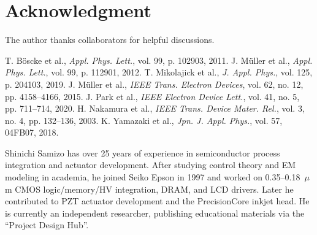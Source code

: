 \documentclass[conference]{IEEEtran}
\begin{document}
\section*{Acknowledgment}
The author thanks collaborators for helpful discussions.

\begin{thebibliography}{1}
 T. Böscke et al., \textit{Appl. Phys. Lett.}, vol. 99, p. 102903, 2011.
 J. Müller et al., \textit{Appl. Phys. Lett.}, vol. 99, p. 112901, 2012.
 T. Mikolajick et al., \textit{J. Appl. Phys.}, vol. 125, p. 204103, 2019.
 J. Müller et al., \textit{IEEE Trans. Electron Devices}, vol. 62, no. 12, pp. 4158--4166, 2015.
 J. Park et al., \textit{IEEE Electron Device Lett.}, vol. 41, no. 5, pp. 711--714, 2020.
 H. Nakamura et al., \textit{IEEE Trans. Device Mater. Rel.}, vol. 3, no. 4, pp. 132--136, 2003.
 K. Yamazaki et al., \textit{Jpn. J. Appl. Phys.}, vol. 57, 04FB07, 2018.
\end{thebibliography}

\begin{IEEEbiography}{Shinichi Samizo}
has over 25 years of experience in semiconductor process integration and actuator development. After studying control theory and EM modeling in academia, he joined Seiko Epson in 1997 and worked on 0.35--0.18~$\mu$m CMOS logic/memory/HV integration, DRAM, and LCD drivers. Later he contributed to PZT actuator development and the PrecisionCore inkjet head. He is currently an independent researcher, publishing educational materials via the ``Project Design Hub''.
\end{IEEEbiography}
\end{document}
